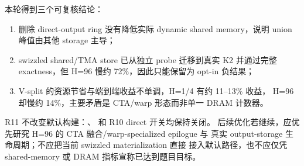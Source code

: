 本轮得到三个可复核结论：

\begin{enumerate}
  \item 删除 direct-output ring 没有降低实际 dynamic shared memory，说明
        union 峰值由其他 storage 主导；
  \item swizzled shared/TMA store 已从独立 probe 迁移到真实 K2 并通过完整
        exactness，但 H=96 慢约 72\%，因此只能保留为 opt-in 负结果；
  \item V-split 的资源节省与端到端收益不单调，H=1/4 有约 11--13\% 收益，
        H=96 却慢约 14\%，主要矛盾是 CTA/warp 形态而非单一 DRAM 计数器。
\end{enumerate}

R11 不改变默认构建：、
 和 R10 direct 开关均保持关闭。
后续优化若继续，应优先研究 H=96 的 CTA 融合/warp-specialized epilogue 与
真实 output-storage 生命周期；不应把当前 swizzled materialization 直接
接入默认路径，也不应仅凭 shared-memory 或 DRAM 指标宣称已达到题目目标。
